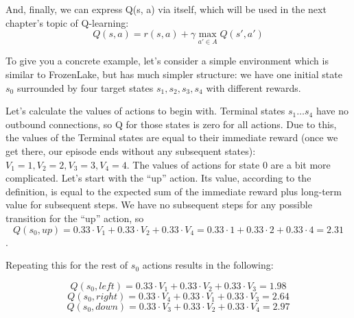 And, finally, we can express Q(s, a) via itself, which will be used in the next chapter’s topic of Q-learning:
\begin{equation*}
Q(s,a)=r(s,a) + \gamma \max_{a' \in A}Q(s',a')
\end{equation*}

To give you a concrete example, let’s consider a simple environment which is
similar to FrozenLake, but has much simpler structure: we have one initial state
\begin{math}s_0\end{math} surrounded by four target states \begin{math}s_1, s_2, s_3, s_4\end{math} with different rewards.

Let’s calculate the values of actions to begin with. Terminal states \begin{math}s_1 \ldots s_4\end{math} have no
outbound connections, so Q for those states is zero for all actions. Due to this, the
values of the Terminal states are equal to their immediate reward (once we get there,
our episode ends without any subsequent states): \begin{math}V_1 = 1, V_2 = 2, V_3 = 3, V_4 = 4\end{math}.
The values of actions for state 0 are a bit more complicated. Let’s start with the
“up” action. Its value, according to the definition, is equal to the expected sum
of the immediate reward plus long-term value for subsequent steps. We have no
subsequent steps for any possible transition for the “up” action, so
\begin{equation*}
  Q(s_0, up) = 0.33 \cdot V_1 + 0.33 \cdot V_2 + 0.33 \cdot V_4 = 0.33 \cdot 1 + 0.33 \cdot 2 + 0.33 \cdot 4 = 2.31
\end{equation*}.

Repeating this for the rest of \begin{math}s_0\end{math} actions results in the following:

\begin{equation*}
Q(s_0, left) = 0.33 \cdot V_1 + 0.33 \cdot V_2 + 0.33 \cdot V_3 = 1.98
\end{equation*}
\begin{equation*}
Q(s_0, right) = 0.33 \cdot V_4 + 0.33 \cdot V_1 + 0.33 \cdot V_3 = 2.64
\end{equation*}
\begin{equation*}
Q(s_0, down) = 0.33 \cdot V_3 + 0.33 \cdot V_2 + 0.33 \cdot V_4 = 2.97
\end{equation*}

